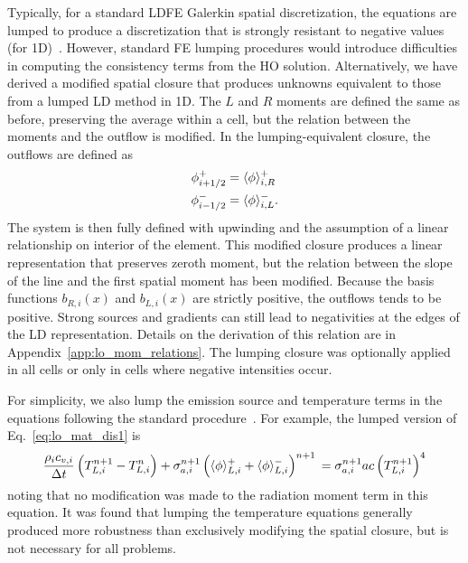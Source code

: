 Typically, for a standard LDFE Galerkin spatial discretization,
the equations are lumped to produce a discretization that is strongly resistant to
negative values (for 1D)~\cite{morel_ldtrt}.
However, standard FE lumping
procedures would introduce difficulties in computing the consistency terms from the
HO solution.  
 Alternatively, we have derived a modified spatial closure that produces
unknowns equivalent to those from a lumped LD method in 1D.
The $L$ and $R$ moments are defined the same as before,
preserving the average within a cell, but the relation between the moments and
the outflow is modified. 
In the lumping-equivalent closure, the outflows are defined as
\begin{align}
    \phi_{i+1/2}^+ &= \langle \phi \rangle_{i,R}^+ \\
    \phi_{i-1/2}^- &= \langle \phi \rangle_{i,L}^-. 
\end{align}
The system is then fully defined with upwinding and the assumption of a linear relationship on
interior of the element.  This modified closure produces a linear
representation that preserves zeroth moment, but the relation between the slope of the line and the 
first spatial moment has been modified.  Because the basis functions $b_{R,i}(x)$ and $b_{L,i}(x)$ are strictly
positive, the outflows tends to be positive. Strong sources and gradients can still lead to
negativities at the edges of the LD representation.  Details on the
derivation of this relation are in Appendix~\ref{app:lo_mom_relations}. 
The lumping closure was optionally applied in all cells or only in cells where negative
 intensities occur.  

For simplicity,
we also lump the emission source and temperature terms in the equations following the
standard procedure~\cite{morel_ldtrt}.  For example, the lumped version of Eq.~\eqref{eq:lo_mat_dis1}
is
\begin{equation}\label{eq:lumped_mat}
     \frac{\rho_i c_{v,i}}{\Delta t}\left(T_{L,i}^{n+1} - T_{L,i}^{n}\right)  + \sigma_{a,i}^{n+1} \left( \langle \phi \rangle_{L,i}^+ +
    \langle \phi \rangle_{L,i}^- \right)^{n+1} \\ = \sigma_{a,i}^{n+1}a c
    \left( T_{L,i}^{n+1}\right)^4
    \end{equation}
noting that no modification was made to the radiation moment term in this equation.  It was found that
lumping the temperature equations generally produced more robustness than exclusively
modifying the spatial closure, but is not necessary for all problems.

